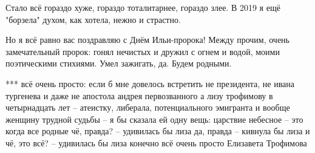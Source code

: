 Стало всё гораздо хуже, гораздо тоталитарнее, гораздо злее. В 2019 я ещё
"борзела" духом, как хотела, нежно и страстно.

Но я всё равно вас поздравляю с Днём Ильи-пророка! Между прочим, очень
замечательный пророк: гонял нечистых и дружил с огнем и водой, моими
поэтическими стихиями. Умел зажигать, да. Будем родными.

***
\obeycr
всё очень просто:
если б мне довелось встретить
не президента, не ивана тургенева и даже не апостола андрея первозванного
а лизу трофимову в четырнадцать лет –
атеистку, либерала, потенциального эмигранта и вообще женщину трудной судьбы –
я бы сказала ей одну вещь:
царствие небесное – это когда все родные
чё, правда? – удивилась бы лиза 
да, правда – кивнула бы лиза 
и чё, это всё? – удивилась бы лиза 
конечно
всё очень просто
 Елизавета Трофимова

